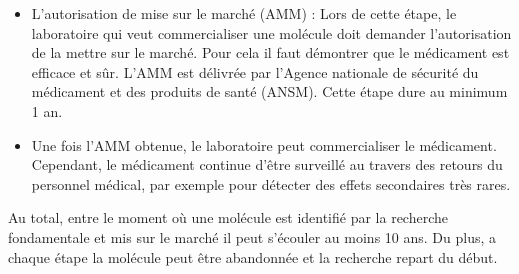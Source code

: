 \documentclass[12pt,a4paper]{report}
\begin{document}
\begin{appendix}
\begin{itemize}
    \item L’autorisation de mise sur le marché (AMM) : Lors de cette étape, le laboratoire qui veut commercialiser une molécule doit demander l'autorisation de la mettre sur le marché. Pour cela il faut démontrer que le médicament est efficace et sûr. L'AMM est délivrée par l'Agence nationale de sécurité du médicament et des produits de santé (ANSM). Cette étape dure au minimum 1 an.
    \item Une fois l'AMM obtenue, le laboratoire peut commercialiser le médicament. Cependant, le médicament continue d'être surveillé au travers des retours du personnel médical, par exemple pour détecter des effets secondaires très rares.
\end{itemize}

Au total, entre le moment où une molécule est identifié par la recherche fondamentale et mis sur le marché il peut s'écouler au moins 10 ans. \cite{DeveloppementMedicamentInserm} Du plus, a chaque étape la molécule peut être abandonnée et la recherche repart du début. \cite{denisvanwaerebekeJamesOuRoman2018}

\end{appendix}

\printbibliography
\end{document}
